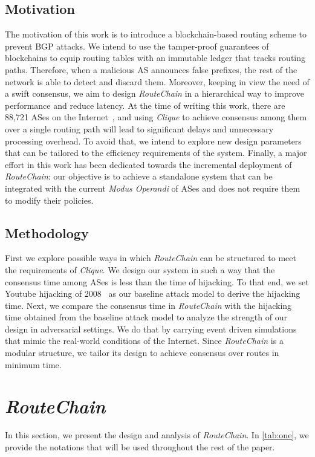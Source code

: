\documentclass[conference]{IEEEtran}
\newcommand{\rc}{{{\em RouteChain}}\xspace}
\begin{document}
\subsection{Motivation}\label{sec:motivation}
The motivation of this work is to introduce a blockchain-based routing scheme to prevent BGP attacks. We intend to use the tamper-proof guarantees of blockchains to equip routing tables with an immutable ledger that tracks routing paths. Therefore, when a malicious AS announces false prefixes, the rest of the network is able to detect and discard them. Moreover, keeping in view the need of a swift consensus, we aim to design \rc in a hierarchical way to improve performance and reduce latency. At the time of writing this work, there are 88,721 ASes on the Internet~\cite{RIR-18}, and using {\em Clique} to achieve consensus among them over a single routing path will lead to significant delays and unnecessary processing overhead. To avoid that, we intend to explore new design parameters that can be tailored to the efficiency requirements of the system.  Finally, a major effort in this work has been dedicated towards the incremental deployment of \rc: our objective is to achieve a standalone system that can be integrated with the current {\em Modus Operandi} of ASes and does not require them to modify their policies. 


\subsection{Methodology}\label{sec:method}
First we explore possible ways in which \rc can be structured to meet the requirements of {\em Clique}. We design our system in such a way that the consensus time among ASes is less than the time of hijacking. To that end, we set Youtube hijacking of 2008~\cite{GoldbergS14} as our baseline attack model to derive the hijacking time. Next, we compare the consensus time in \rc with the hijacking time obtained from the baseline attack model to analyze the strength of our design in adversarial settings. We do that by carrying event driven simulations that mimic the real-world conditions of the Internet. Since \rc is a modular structure, we tailor its design to achieve consensus over routes in minimum time. 




\section{\rc}\label{sec:rc}
In this section, we present the design and analysis of \rc. In \autoref{tab:one}, we provide the notations that will be used throughout the rest of the paper.  
\end{document}
